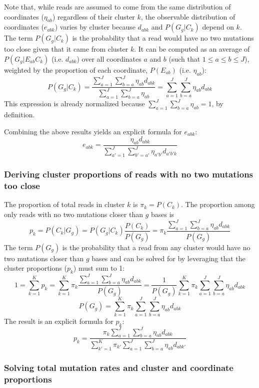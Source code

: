 \documentclass[11pt]{article}
\begin{document}
Note that, while reads are assumed to come from the same distribution of coordinates ($\eta_{ab}$) regardless of their cluster $k$, the observable distribution of coordinates ($e_{abk}$) varies by cluster because $d_{abk}$ and $P(G_g | C_k)$ depend on $k$.
The term $P(G_g | C_k)$ is the probability that a read would have no two mutations too close given that it came from cluster $k$.
It can be computed as an average of $P(G_g | E_{ab} C_k)$ (i.e. $d_{abk}$) over all coordinates $a$ and $b$ (such that $1 \le a \le b \le J$), weighted by the proportion of each coordinate, $P(E_{ab})$ (i.e. $\eta_{ab}$):
$$P(G_g | C_k) = \frac{\sum_{a=1}^{J} \sum_{b=a}^{J} \eta_{ab} d_{abk}}{\sum_{a=1}^{J} \sum_{b=a}^{J} \eta_{ab}} = \sum_{a=1}^{J} \sum_{b=a}^{J} \eta_{ab} d_{abk}$$
This expression is already normalized because $\sum_{a=1}^{J} \sum_{b=a}^{J} \eta_{ab} = 1$, by definition.

Combining the above results yields an explicit formula for $e_{abk}$:
$$e_{abk} = \frac{\eta_{ab} d_{abk}}{\sum_{a'=1}^{J} \sum_{b'=a'}^{J} \eta_{a'b'} d_{a'b'k}}$$

\subsubsection{Deriving cluster proportions of reads with no two mutations too close}
\label{calc_p_clust_noclose}

The proportion of total reads in cluster $k$ is $\pi_k = P(C_k)$.
The proportion among only reads with no two mutations closer than $g$ bases is
$$p_k = P(C_k | G_g) = P(G_g | C_k) \frac{P(C_k)}{P(G_g)} = \pi_k \frac{\sum_{a=1}^{J} \sum_{b=a}^{J} \eta_{ab} d_{abk}}{P(G_g)}$$
The term $P(G_g)$ is the probability that a read from any cluster would have no two mutations closer than $g$ bases and can be solved for by leveraging that the cluster proportions ($p_k$) must sum to 1:
$$1 = \sum_{k=1}^{K} p_k = \sum_{k=1}^{K} \pi_k \frac{\sum_{a=1}^{J} \sum_{b=a}^{J} \eta_{ab} d_{abk}}{P(G_g)} = \frac{1}{{P(G_g)}} \sum_{k=1}^{K} \pi_k \sum_{a=1}^{J} \sum_{b=a}^{J} \eta_{ab} d_{abk}$$
$$P(G_g) = \sum_{k=1}^{K} \pi_k \sum_{a=1}^{J} \sum_{b=a}^{J} \eta_{ab} d_{abk}$$
The result is an explicit formula for $p_k$:
$$p_k = \frac{\pi_k \sum_{a=1}^{J} \sum_{b=a}^{J} \eta_{ab} d_{abk}}{\sum_{k'=1}^{K} \pi_{k'} \sum_{a=1}^{J} \sum_{b=a}^{J} \eta_{ab} d_{abk'}}$$

\subsubsection{Solving total mutation rates and cluster and coordinate proportions}
\label{calc_params}
\end{document}

